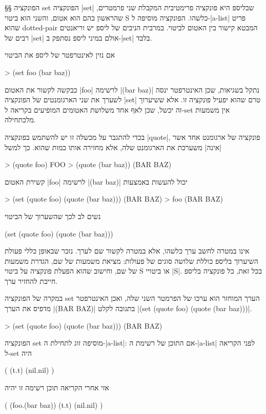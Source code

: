 §§ הפונקציה set
הפונקציה \T|set| שבליספ היא פונקציה פרימטיבית המקבלת שני פרמטרים, שהראשון בהם
הוא אטום, והשני הוא ביטוי S כלשהו. הפונקציה מוסיפה ל-\E|a-list| פריט שהוא
dotted-pair
המבטא קישור בין האטום לביטוי. במרבית הניבים של ליספ יש וריאנטים רבים של
\T|set| אולם במיני ליספ נסתפק ב-\T|set| בלבד.

אם נזין לאינטרפטר של ליספ את הביטוי
\begin{LISP}
> (set foo (bar baz))
\end{LISP}
כבקשה לקשור את האטום \T|foo| לרשימה \T|(bar baz)|
נתקל בשגיאות, שכן האינטרפטר ינסה לשערך את שני הארגומנטים של הפונקציה \E|set|
טרם שהוא יפעיל פונקציה זו. אלא ששיערוך זה יכשל, שכן לאף אחד משלושת האטומים
המופיעים בקריאה ל-set אין משמעות מלכתחילה.

בכדי להתגבר על מכשלה זו יש להשתמש בפונקציה \T|quote|, פונקציה של ארגומנט אחד
אשר \ע|אינה| משערכת את הארגומנט שלה, אלא מחזירה אותו כמות שהוא.
כך למשל
\begin{LISP}
> (quote foo)
FOO
> (quote (bar baz))
(BAR BAZ)
\end{LISP}
קשירת האטום \T|foo| לרשימה \T|(bar baz)| יכול להעשות באמצעות
\begin{LISP}
> (set (quote foo) (quote (bar baz)))
(BAR BAZ)
> foo
(BAR BAZ)
\end{LISP}
נשים לב לכך שהשערוך של הביטוי
\begin{LISP}
(set (quote foo) (quote (bar baz)))
\end{LISP}
אינו במטרה לחשב ערך כלשהו, אלא במטרה לקשור שם לערך. נזכר שבאופן כללי פעולת
השיערוך בליספ כוללת שלושה סוגים של פעולות: מציאת משמעות של שם, הגדרת
משמעות של שם, וחישוב שהוא הפעלת פונקציה על ביטוי S או ביטויי \E|S|.
בכל זאת, כל פונקציה בליספ חייבת להחזיר ערך.

במקרה של הפונקציה set הערך המוחזר הוא ערכו של הפרמטר השני שלה, ואכן האינטרפטר
מדפיס את הערך \T|(BAR BAZ)| בתגובה לקלט \T|(set (quote foo) (quote (bar
baz)))|.

\begin{LISP}
> (set (quote foo) (quote (bar baz)))
(BAR BAZ)
\end{LISP}

הפונקציה set מוסיפה זוג לתחילת ה-\E|a-list|: אם התוכן של רשימת ה-\E|a-list|
לפני הקריאה ל-set היה \begin{LISP}
(
  (t.t)
  (nil.nil)
)
\end{LISP}

\minipage\textwidth
אזי אחרי הקריאה תוכן רשימה זו יהיה
\begin{LISP}
(
  (foo.(bar baz))
  (t.t)
  (nil.nil)
)
\end{LISP}
\endminipage

